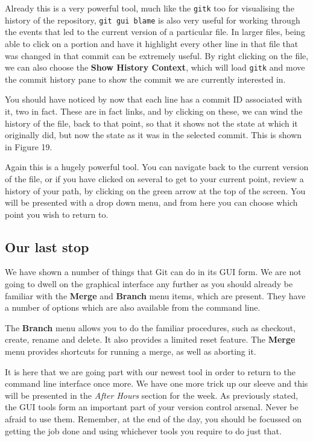 Already this is a very powerful tool, much like the \texttt{gitk} too for visualising the history of the repository, \texttt{git gui blame} is also very useful for working through the events that led to the current version of a particular file.
In larger files, being able to click on a portion and have it highlight every other line in that file that was changed in that commit can be extremely useful.
By right clicking on the file, we can also choose the \textbf{Show History Context}, which will load \texttt{gitk} and move the commit history pane to show the commit we are currently interested in.


You should have noticed by now that each line has a commit ID associated with it, two in fact.
These are in fact links, and by clicking on these, we can wind the history of the file, back to that point, so that it shows not the state at which it originally did, but now the state as it was in the selected commit.
This is shown in Figure 19.


Again this is a hugely powerful tool.
You can navigate back to the current version of the file, or if you have clicked on several to get to your current point, review a history of your path, by clicking on the green arrow at the top of the screen.
You will be presented with a drop down menu, and from here you can choose which point you wish to return to.

\subsection{Our last stop}
We have shown a number of things that Git can do in its GUI form.
We are not going to dwell on the graphical interface any further as you should already be familiar with the \textbf{Merge} and \textbf{Branch} menu items, which are present.
They have a number of options which are also available from the command line.

The \textbf{Branch} menu allows you to do the familiar procedures, such as checkout, create, rename and delete.
It also provides a limited reset feature.
The \textbf{Merge} menu provides shortcuts for running a merge, as well as aborting it.

It is here that we are going part with our newest tool in order to return to the command line interface once more.
We have one more trick up our sleeve and this will be presented in the \emph{After Hours} section for the week.
As previously stated, the GUI tools form an important part of your version control arsenal.
Never be afraid to use them.
Remember, at the end of the day, you should be focussed on getting the job done and using whichever tools you require to do just that.

